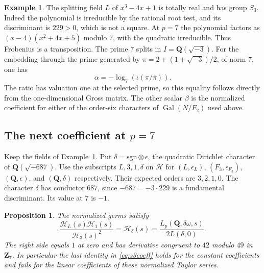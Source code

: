 \documentclass[11pt]{amsart}
\numberwithin{equation}{section}
\newtheorem{proposition}[theorem]{Proposition}
\theoremstyle{definition}
\newtheorem{example}[theorem]{Example}
\theoremstyle{remark}
\newcommand{\Q}{\mathbf Q}
\newcommand{\Z}{\mathbf Z}
\newcommand{\Gal}{\operatorname{Gal}}
\begin{document}
\begin{example}\label{ex:concrete}
The splitting field $L$ of $x^3-4x+1$ is totally real and
has group $S_3$. Indeed the polynomial is irreducible by
the rational root test, and its discriminant is $229>0$,
which is not a square. At $p=7$ the polynomial factors as
$(x-4)(x^2+4x+5)$ modulo $7$, with the quadratic
irreducible. Thus Frobenius is a transposition. The prime
$7$ splits in $I=\Q(\sqrt{-3})$. For the embedding through
the prime generated by $\pi=2+(1+\sqrt{-3})/2$, of norm
$7$, one has
\[
 \alpha=-\log_7(\iota(\pi/\overline{\pi})).
\]
The ratio has valuation one at the selected prime, so
this equality follows directly from the one-dimensional
Gross matrix. The other scalar $\beta$ is the normalized
coefficient for either of the order-six characters of
$\Gal(N/F_2)$ used above.
\end{example}

\subsection{The next coefficient at \texorpdfstring{$p=7$}{p = 7}}
\label{subsec:nextcoefficient}

Keep the fields of Example~\ref{ex:concrete}. Put
$\delta=\mathrm{sgn}\otimes\epsilon$, the quadratic Dirichlet
character of $\Q(\sqrt{-687})$. Use the subscripts $L,3,1,\delta$
on $\mathcal H$ for $(L,\epsilon_L)$, $(F_3,\epsilon_{F_3})$,
$(\Q,\epsilon)$, and $(\Q,\delta)$ respectively. Their expected
orders are $3,2,1,0$. The character $\delta$ has conductor $687$,
since $-687=-3\cdot229$ is a fundamental discriminant. Its value
at $7$ is $-1$.

\begin{proposition}\label{prop:next}
The normalized germs satisfy
\[
 \frac{\mathcal H_L(s)\mathcal H_1(s)}{\mathcal H_3(s)^2}
       =\mathcal H_\delta(s)
       =\frac{L_p(\Q,\delta\omega,s)}{2L(\delta,0)} .
\]
The right side equals $1$ at zero and has derivative congruent to
$42$ modulo $49$ in $\Z_7$. In particular the last identity in
\eqref{eq:s3coeff} holds for the constant coefficients and fails
for the linear coefficients of these normalized Taylor series.
\end{proposition}
\end{document}
